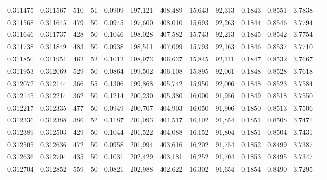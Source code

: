 \begin{tabular}{rrrrrrrrrrrrr}
0.311475 & 0.311567 &   510 &  51 &                                     0.0909 & 197,121 & 408,489 &  15,643 &  92,313 & 0.1843 & 0.8551 & 3.7838 \\
0.311568 & 0.311645 &   479 &  50 &                                     0.0945 & 197,600 & 408,010 &  15,693 &  92,263 & 0.1844 & 0.8546 & 3.7794 \\
0.311646 & 0.311737 &   428 &  50 &                                     0.1046 & 198,028 & 407,582 &  15,743 &  92,213 & 0.1845 & 0.8542 & 3.7754 \\
0.311738 & 0.311849 &   483 &  50 &                                     0.0938 & 198,511 & 407,099 &  15,793 &  92,163 & 0.1846 & 0.8537 & 3.7710 \\
0.311850 & 0.311951 &   462 &  52 &                                     0.1012 & 198,973 & 406,637 &  15,845 &  92,111 & 0.1847 & 0.8532 & 3.7667 \\
0.311953 & 0.312069 &   529 &  50 &                                     0.0864 & 199,502 & 406,108 &  15,895 &  92,061 & 0.1848 & 0.8528 & 3.7618 \\
0.312072 & 0.312144 &   366 &  55 &                                     0.1306 & 199,868 & 405,742 &  15,950 &  92,006 & 0.1848 & 0.8523 & 3.7584 \\
0.312145 & 0.312214 &   362 &  50 &                                     0.1214 & 200,230 & 405,380 &  16,000 &  91,956 & 0.1849 & 0.8518 & 3.7550 \\
0.312217 & 0.312335 &   477 &  50 &                                     0.0949 & 200,707 & 404,903 &  16,050 &  91,906 & 0.1850 & 0.8513 & 3.7506 \\
0.312336 & 0.312388 &   386 &  52 &                                     0.1187 & 201,093 & 404,517 &  16,102 &  91,854 & 0.1851 & 0.8508 & 3.7471 \\
0.312389 & 0.312503 &   429 &  50 &                                     0.1044 & 201,522 & 404,088 &  16,152 &  91,804 & 0.1851 & 0.8504 & 3.7431 \\
0.312505 & 0.312636 &   472 &  50 &                                     0.0958 & 201,994 & 403,616 &  16,202 &  91,754 & 0.1852 & 0.8499 & 3.7387 \\
0.312636 & 0.312704 &   435 &  50 &                                     0.1031 & 202,429 & 403,181 &  16,252 &  91,704 & 0.1853 & 0.8495 & 3.7347 \\
0.312704 & 0.312852 &   559 &  50 &                                     0.0821 & 202,988 & 402,622 &  16,302 &  91,654 & 0.1854 & 0.8490 & 3.7295 \\

\end{tabular}
